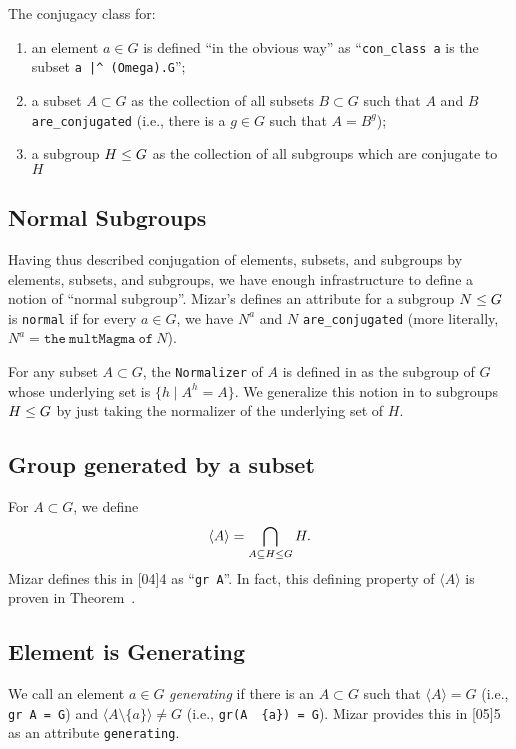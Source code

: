{The conjugacy class for:
\begin{enumerate}
\item an element $a\in G$ is defined ``in the obvious way''
as ``\texttt{con\_class a}
is the subset \verb#a |^ (Omega).G#'';
\item a subset $A\subset G$ as the collection of all subsets $B\subset G$
such that $A$ and $B$ \verb#are_conjugated# (i.e., there is a $g\in G$
such that $A = B^{g}$);
\item a subgroup $H\leq G$ as the collection of all subgroups which
  are conjugate to $H$
\end{enumerate}

\subsection{Normal Subgroups}
Having thus described conjugation of elements, subsets, and subgroups by
elements, subsets, and subgroups, we have enough infrastructure to
define a notion of ``normal subgroup''. Mizar's
 defines an attribute for a subgroup
$N\leq G$ is \verb#normal# if for
every $a\in G$, we have $N^{a}$ and $N$ \verb#are_conjugated# (more
literally, $N^{a} = \mathtt{the~multMagma~of~}N$).

For any subset $A\subset G$, the \verb#Normalizer# of $A$ is defined in
 as the subgroup of $G$ whose
underlying set is $\{h \mid A^{h} = A\}$. We generalize this notion in
 to subgroups $H\leq G$ by just taking the
normalizer of the underlying set of $H$.

\subsection{Group generated by a subset}
For $A\subset G$, we define
\begin{equation}
\langle A\rangle = \bigcap_{A\subseteq H\leq G} H.
\end{equation}
Mizar defines this in [04]{4} as
``\verb#gr A#''. In fact, this defining
property of $\langle A\rangle$ is proven in Theorem~.

\subsection{Element is Generating}
We call an element $a\in G$ \emph{generating} if there is an $A\subset G$
such that $\langle A\rangle = G$ (i.e., \texttt{gr A = G}) and
$\langle A\setminus\{a\}\rangle\neq G$ (i.e., \texttt{gr(A \ \{a\}) = G}).
Mizar provides this in [05]{5} as
an attribute \verb#generating#.

}
